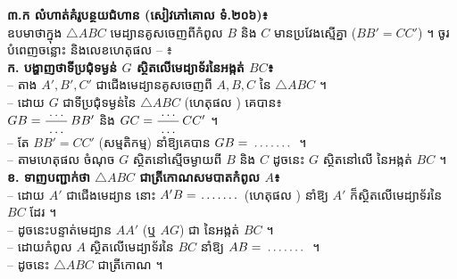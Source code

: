 \documentclass[a4paper,10pt]{article}
\newcommand{\cnum}[1]{\mbox{\fontsize{10pt}{12pt}\selectfont\ding{\numexpr181+#1\relax}}}
\newcommand{\blank}[1]{\makebox[#1]{\dotfill}}
\newcommand{\tri}[1]{\ensuremath{\triangle #1}}
\begin{document}
\noindent
\begin{minipage}[t]{10.4cm}\vspace{0pt}
  \begin{tcolorbox}[
    enhanced, sharp corners, colback=white, colframe=black, equal height group=rowE4,
    boxrule=0.85pt, boxsep=2pt, top=3pt, bottom=3pt, left=5pt, right=5pt
  ]
    \textbf{៣.ក លំហាត់គំរូបន្ថយជំហាន (សៀវភៅគោល ទំ.២០៦)៖}\\
    ឧបមាថាក្នុង $\tri{ABC}$ មេដ្យានគូសចេញពីកំពូល $B$ និង $C$ មានប្រវែងស្មើគ្នា ($BB'=CC'$) ។ ចូរបំពេញចន្លោះ និងលេខហេតុផល \cnum{1}--\cnum{5} ៖\\[3pt]
    \textbf{ក. បង្ហាញថាទីប្រជុំទម្ងន់ $G$ ស្ថិតលើមេដ្យាទ័រនៃអង្កត់ $BC$៖}\\
    -- តាង $A', B', C'$ ជាជើងមេដ្យានគូសចេញពី $A, B, C$ នៃ $\tri{ABC}$ ។\\
    -- ដោយ $G$ ជាទីប្រជុំទម្ងន់នៃ $\tri{ABC}$ (ហេតុផល \blank{0.9cm}) គេបាន៖\\
    \hspace*{0.4cm}$GB = \dfrac{\blank{0.6cm}}{\blank{0.6cm}}\,BB'$ \quad និង \quad $GC = \dfrac{\blank{0.6cm}}{\blank{0.6cm}}\,CC'$ ។\\
    -- តែ $BB' = CC'$ (សម្មតិកម្ម) នាំឱ្យគេបាន $GB = \blank{1.2cm}$ ។\\
    -- តាមហេតុផល \blank{0.9cm} ចំណុច $G$ ស្ថិតនៅស្មើចម្ងាយពី $B$ និង $C$ ដូចនេះ $G$ ស្ថិតនៅលើ \blank{2.8cm} នៃអង្កត់ $BC$ ។\\[4pt]
    \textbf{ខ. ទាញបញ្ជាក់ថា $\tri{ABC}$ ជាត្រីកោណសមបាតកំពូល $A$៖}\\
    -- ដោយ $A'$ ជាជើងមេដ្យាន នោះ $A'B = \blank{1.1cm}$ (ហេតុផល \blank{0.9cm}) នាំឱ្យ $A'$ ក៏ស្ថិតលើមេដ្យាទ័រនៃ $BC$ ដែរ ។\\
    -- ដូចនេះបន្ទាត់មេដ្យាន $AA'$ (ឬ $AG$) ជា \blank{2.6cm} នៃអង្កត់ $BC$ ។\\
    -- ដោយកំពូល $A$ ស្ថិតលើមេដ្យាទ័រនៃ $BC$ នាំឱ្យ $AB = \blank{1.2cm}$ ។\\
    -- ដូចនេះ $\tri{ABC}$ ជាត្រីកោណ \blank{3.2cm} ។
  \end{tcolorbox}
\end{minipage}%
\hfill
\end{document}
